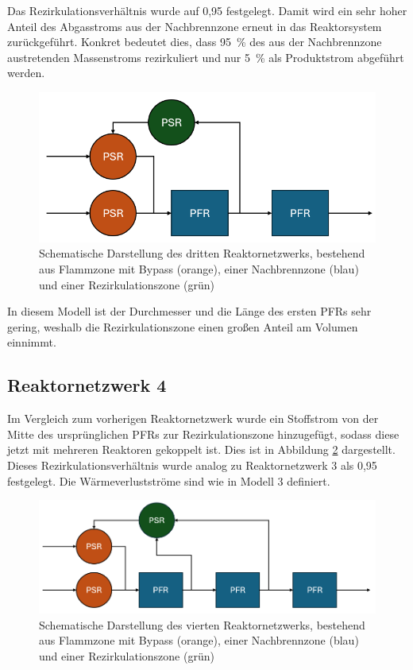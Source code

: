             Das Rezirkulationsverhältnis wurde auf 0,95 festgelegt. Damit wird ein sehr hoher Anteil des Abgasstroms aus der Nachbrennzone erneut in das Reaktorsystem zurückgeführt. Konkret bedeutet dies, dass 95~\% des aus der Nachbrennzone austretenden Massenstroms rezirkuliert und nur 5~\% als Produktstrom abgeführt werden. 
            \begin{figure}[H]
                \centering
                \includegraphics[width=0.8\linewidth]{img/Erweiterungen/3.png}
                \caption{Schematische Darstellung des dritten Reaktornetzwerks, bestehend aus Flammzone mit Bypass (orange), einer Nachbrennzone (blau) und einer Rezirkulationszone (grün)}
                \label{fig:reaktornetzwerk3}
            \end{figure}
            In diesem Modell ist der Durchmesser und die Länge des ersten PFRs sehr gering, weshalb die Rezirkulationszone einen großen Anteil am Volumen einnimmt. 
        \subsection*{Reaktornetzwerk 4}
            Im Vergleich zum vorherigen Reaktornetzwerk wurde ein Stoffstrom von der Mitte des ursprünglichen PFRs zur Rezirkulationszone hinzugefügt, sodass diese jetzt mit mehreren Reaktoren gekoppelt ist. Dies ist in Abbildung \ref{fig:reaktornetzwerk4} dargestellt. Dieses Rezirkulations\-verhältnis wurde analog zu Reaktornetzwerk 3 als 0,95 festgelegt. Die Wärmeverlustströme sind wie in Modell 3 definiert. 
            \begin{figure}[H]
                \centering
                \includegraphics[width=0.8\linewidth]{img/Erweiterungen/4.png}
                \caption{Schematische Darstellung des vierten Reaktornetzwerks, bestehend aus Flammzone mit Bypass (orange), einer Nachbrennzone (blau) und einer Rezirkulationszone (grün)}
                \label{fig:reaktornetzwerk4}
            \end{figure}
